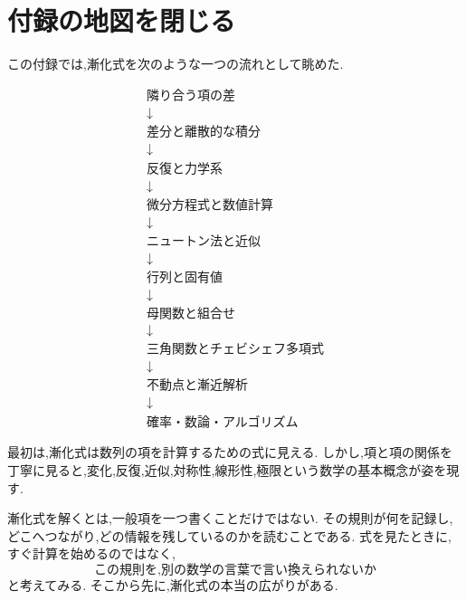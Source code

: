 
\section{付録の地図を閉じる}

この付録では,漸化式を次のような一つの流れとして眺めた.

\[
  \begin{array}{c}
    \text{隣り合う項の差}        \\
    \downarrow            \\
    \text{差分と離散的な積分}      \\
    \downarrow            \\
    \text{反復と力学系}         \\
    \downarrow            \\
    \text{微分方程式と数値計算}     \\
    \downarrow            \\
    \text{ニュートン法と近似}      \\
    \downarrow            \\
    \text{行列と固有値}         \\
    \downarrow            \\
    \text{母関数と組合せ}        \\
    \downarrow            \\
    \text{三角関数とチェビシェフ多項式} \\
    \downarrow            \\
    \text{不動点と漸近解析}       \\
    \downarrow            \\
    \text{確率・数論・アルゴリズム}
  \end{array}
\]

最初は,漸化式は数列の項を計算するための式に見える.
しかし,項と項の関係を丁寧に見ると,変化,反復,近似,対称性,線形性,極限という数学の基本概念が姿を現す.

漸化式を解くとは,一般項を一つ書くことだけではない.
その規則が何を記録し,どこへつながり,どの情報を残しているのかを読むことである.
式を見たときに,すぐ計算を始めるのではなく,
\[
  \text{この規則を,別の数学の言葉で言い換えられないか}
\]
と考えてみる.
そこから先に,漸化式の本当の広がりがある.
